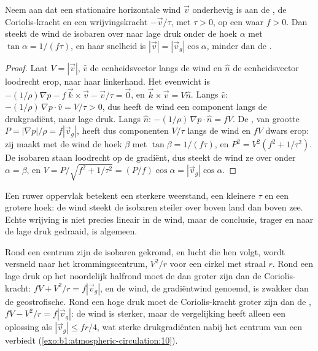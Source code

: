 \begin{proposition}\label{prop:b1:atmospheric-circulation:friction}
Neem aan dat een stationaire horizontale wind $\vec v$ onderhevig is aan de , de Coriolis-kracht en een wrijvingskracht $-\vec v/\tau$, met $\tau > 0$, op een  waar $f > 0$. Dan steekt de wind de isobaren over naar lage druk onder de hoek $\alpha$ met $\tan\alpha = 1/(f\tau)$, en haar snelheid is $|\vec v| =
|\vec v_g|\cos\alpha$, minder dan de .
\end{proposition}

\begin{proof}
Laat $V = |\vec v|$, $\hat v$ de eenheidsvector langs de wind en $\hat n$ de eenheidsvector loodrecht erop, naar haar linkerhand. Het evenwicht is $-(1/\rho)\nabla p - f\,
\vec k\times\vec v - \vec v/\tau = \vec 0$, en $\vec k\times\vec v = V\hat n$.
Langs $\hat v$: $-(1/\rho)\,\nabla p\cdot\hat v = V/\tau > 0$, dus heeft de wind een component langs de drukgradiënt, naar lage druk. Langs $\hat n$:
$-(1/\rho)\,\nabla p\cdot\hat n = fV$. De , van grootte $P =
|\nabla p|/\rho = f|\vec v_g|$, heeft dus componenten $V/\tau$ langs de wind en
$fV$ dwars erop: zij maakt met de wind de hoek $\beta$ met $\tan\beta =
1/(f\tau)$, en $P^2 = V^2(f^2 + 1/\tau^2)$. De isobaren staan loodrecht op de
gradiënt, dus steekt de wind ze over onder $\alpha = \beta$, en $V = P/\sqrt{f^2 +
1/\tau^2} = (P/f)\cos\alpha = |\vec v_g|\cos\alpha$.
\end{proof}

Een ruwer oppervlak betekent een sterkere weerstand, een kleinere $\tau$ en een grotere hoek: de wind steekt de isobaren steiler over boven land dan boven zee. Echte wrijving is niet precies lineair in de wind, maar de conclusie, trager en naar de lage druk gedraaid, is algemeen.

\begin{remark}[De gradiëntwind]\label{rem:b1:atmospheric-circulation:gradient}
Rond een centrum zijn de isobaren gekromd, en lucht die hen volgt, wordt versneld naar het krommingscentrum, $V^2/r$ voor een cirkel met straal $r$. Rond een lage druk op het noordelijk halfrond moet de  dan groter zijn dan de Coriolis-kracht: $fV + V^2/r = f|\vec v_g|$, en de wind, de gradiëntwind genoemd, is zwakker dan de geostrofische. Rond een hoge druk moet de Coriolis-kracht groter zijn dan de , $fV - V^2/r = f|\vec v_g|$: de wind is sterker, maar de vergelijking heeft alleen een oplossing als $|\vec v_g| \leq fr/4$, wat sterke drukgradiënten nabij het centrum van een  verbiedt (\cref{exo:b1:atmospheric-circulation:10}).
\end{remark}

